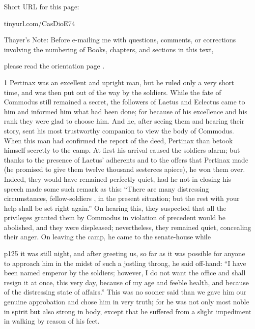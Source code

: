 
Short URL for this page:

tinyurl.com/CasDioE74

Thayer's Note: Before e-mailing me with questions, comments, or corrections involving the numbering of Books, chapters, and sections in this text,

please read the orientation page .

1
Pertinax was an excellent and upright man, but he ruled only a very short time, and was then put out of the way by the soldiers. While the fate of Commodus still remained a secret, the followers of Laetus and Eclectus came to him and informed him what had been done; for because of his excellence and his rank they were glad to choose him. And he, after seeing them and hearing their story, sent his most trustworthy companion to view the body of Commodus. When this man had confirmed the report of the deed, Pertinax than betook himself secretly to the camp. At first his arrival caused the soldiers alarm; but thanks to the presence of Laetus' adherents and to the offers that Pertinax made (he promised to give them twelve thousand sesterces apiece), he won them over. Indeed, they would have remained perfectly quiet, had he not in closing his speech made some such remark as this: ``There are many distressing circumstances, fellow-soldiers , in the present situation; but the rest with your help shall be set right again.'' On hearing this, they suspected that all the privileges granted them by Commodus in violation of precedent would be abolished, and they were displeased; nevertheless, they remained quiet, concealing their anger. On leaving the camp, he came to the senate-house while

p125 it was still night, and after greeting us, so far as it was possible for anyone to approach him in the midst of such a jostling throng, he said off-hand: ``I have been named emperor by the soldiers; however, I do not want the office and shall resign it at once, this very day, because of my age and feeble health, and because of the distressing state of affairs.'' This was no sooner said than we gave him our genuine approbation and chose him in very truth; for he was not only most noble in spirit but also strong in body, except that he suffered from a slight impediment in walking by reason of his feet.

